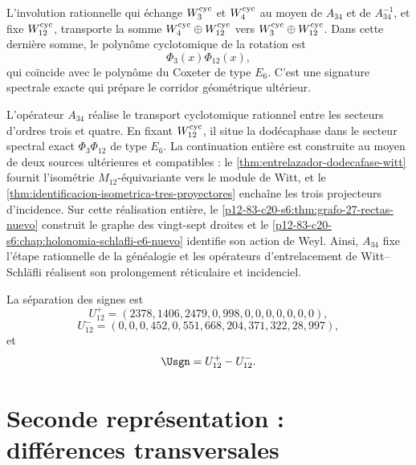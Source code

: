L'involution rationnelle qui échange \(W_3^{\rm cyc}\) et
\(W_4^{\rm cyc}\) au moyen de \(A_{34}\) et de \(A_{34}^{-1}\), et fixe
\(W_{12}^{\rm cyc}\), transporte la somme
\(W_4^{\rm cyc}\oplus W_{12}^{\rm cyc}\) vers
\(W_3^{\rm cyc}\oplus W_{12}^{\rm cyc}\). Dans cette dernière somme, le polynôme
cyclotomique de la rotation est
\[
 \Phi_3(x)\Phi_{12}(x),
\]
qui coïncide avec le polynôme du Coxeter de type \(E_6\). C'est une signature
spectrale exacte qui prépare le corridor géométrique ultérieur.

\begin{statusbox}[title={Transport rationnel et continuation entière}]
L'opérateur \(A_{34}\) réalise le transport cyclotomique rationnel entre les
secteurs d'ordres trois et quatre. En fixant \(W_{12}^{\rm cyc}\), il situe la
dodécaphase dans le secteur spectral exact
\(\Phi_3\Phi_{12}\) de type \(E_6\). La continuation entière est construite
au moyen de deux sources ultérieures et compatibles : le
\cref{thm:entrelazador-dodecafase-witt} fournit l'isométrie
\(M_{12}\)-équivariante vers le module de Witt, et le
\cref{thm:identificacion-isometrica-tres-proyectores} enchaîne les trois
projecteurs d'incidence. Sur cette réalisation entière, le
\cref{p12-83-c20-s6:thm:grafo-27-rectas-nuevo} construit le graphe des
vingt-sept droites et le
\cref{p12-83-c20-s6:chap:holonomia-schlafli-e6-nuevo} identifie son action de
Weyl. Ainsi, \(A_{34}\) fixe l'étape rationnelle de la généalogie et les
opérateurs d'entrelacement de Witt--Schläfli réalisent son prolongement réticulaire et
incidenciel.
\end{statusbox}

La séparation des signes est
\[
U_{12}^{+}
=(2378,1406,2479,0,998,0,0,0,0,0,0,0),
\]
\[
U_{12}^{-}
=(0,0,0,452,0,551,668,204,371,322,28,997),
\]
et
\[
\Usgn=U_{12}^{+}-U_{12}^{-}.
\]

\section{Seconde représentation : différences transversales}


